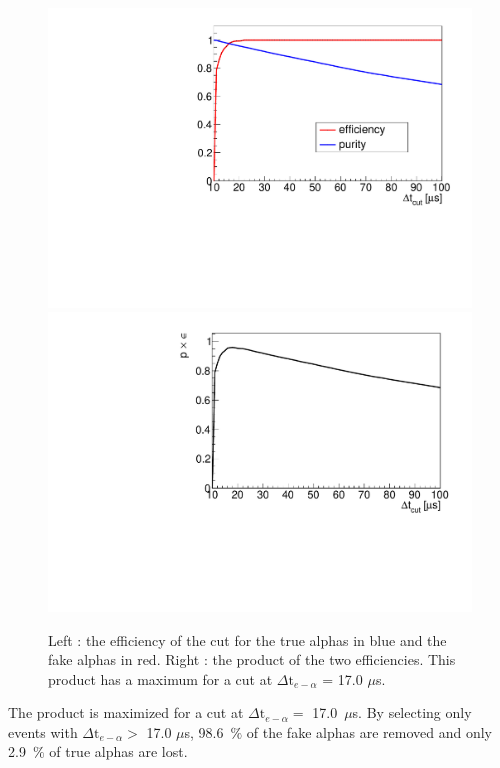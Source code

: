 \documentclass[main.tex]{subfiles}
\begin{document}
\begin{figure}[h!]
\begin{center}
\includegraphics[scale=0.4]{pictures/Chap5/efficiency_purity.pdf}
\includegraphics[scale=0.4]{pictures/Chap5/pe.pdf}
\caption{Left : the efficiency of the cut for the true alphas in blue and the fake alphas in red. Right : the product of the two efficiencies. This product has a maximum for a cut at $\Delta \text{t}_{e-\alpha}$ = 17.0 $\mu$s.}
\label{efficiency_ratio}
\end{center}
\end{figure}

\bigskip

\noindent The product is maximized for a cut at $\Delta \text{t}_{e-\alpha} =$ 17.0~$\mu$s. By selecting only events with $\Delta \text{t}_{e-\alpha} >$ 17.0 $\mu$s, 98.6~$\%$ of the fake alphas are removed and only 2.9~$\%$ of true alphas are lost.
\end{document}
